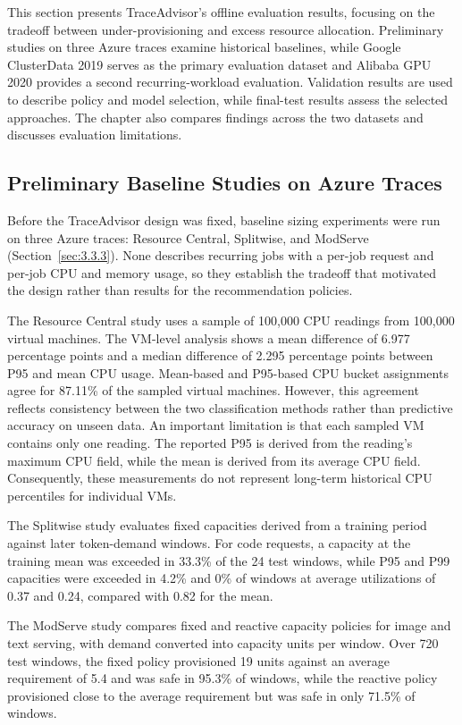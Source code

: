\documentclass{IEEEtran}
\begin{document}
This section presents TraceAdvisor's offline evaluation results, focusing on the tradeoff between under-provisioning and excess resource allocation. Preliminary studies on three Azure traces examine historical baselines, while Google ClusterData 2019 \cite{ref7} serves as the primary evaluation dataset and Alibaba GPU 2020 \cite{ref19} provides a second recurring-workload evaluation. Validation results are used to describe policy and model selection, while final-test results assess the selected approaches. The chapter also compares findings across the two datasets and discusses evaluation limitations.

\subsection{Preliminary Baseline Studies on Azure Traces}\label{sec:7.1}

Before the TraceAdvisor design was fixed, baseline sizing experiments were run on three Azure traces: Resource Central, Splitwise, and ModServe (Section~\ref{sec:3.3.3}). None describes recurring jobs with a per-job request and per-job CPU and memory usage, so they establish the tradeoff that motivated the design rather than results for the recommendation policies.

The Resource Central study uses a sample of 100,000 CPU readings from 100,000 virtual machines. The VM-level analysis shows a mean difference of 6.977 percentage points and a median difference of 2.295 percentage points between P95 and mean CPU usage. Mean-based and P95-based CPU bucket assignments agree for 87.11\% of the sampled virtual machines. However, this agreement reflects consistency between the two classification methods rather than predictive accuracy on unseen data. An important limitation is that each sampled VM contains only one reading. The reported P95 is derived from the reading's maximum CPU field, while the mean is derived from its average CPU field. Consequently, these measurements do not represent long-term historical CPU percentiles for individual VMs.

The Splitwise study evaluates fixed capacities derived from a training period against later token-demand windows. For code requests, a capacity at the training mean was exceeded in 33.3\% of the 24 test windows, while P95 and P99 capacities were exceeded in 4.2\% and 0\% of windows at average utilizations of 0.37 and 0.24, compared with 0.82 for the mean.

The ModServe study compares fixed and reactive capacity policies for image and text serving, with demand converted into capacity units per window. Over 720 test windows, the fixed policy provisioned 19 units against an average requirement of 5.4 and was safe in 95.3\% of windows, while the reactive policy provisioned close to the average requirement but was safe in only 71.5\% of windows.
\end{document}
